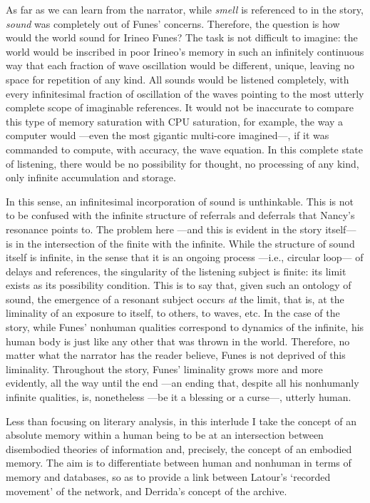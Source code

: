 As far as we can learn from the narrator, while \textit{smell} is referenced to in the story, \textit{sound} was completely out of Funes' concerns. Therefore, the question is how would the world sound for Irineo Funes? The task is not difficult to imagine: the world would be inscribed in poor Irineo's memory in such an infinitely continuous way that each fraction of wave oscillation would be different, unique, leaving no space for repetition of any kind. All sounds would be listened completely, with every infinitesimal fraction of oscillation of the waves pointing to the most utterly complete scope of imaginable references. It would not be inaccurate to compare this type of memory saturation with CPU saturation, for example, the way a computer would ---even the most gigantic multi-core imagined---, if it was commanded to compute, with accuracy, the wave equation. In this complete state of listening, there would be no possibility for thought, no processing of any kind, only infinite accumulation and storage.

In this sense, an infinitesimal incorporation of sound is unthinkable. This is not to be confused with the infinite structure of referrals and deferrals that Nancy's resonance points to. The problem here ---and this is evident in the story itself--- is in the intersection of the finite with the infinite. While the structure of sound itself is infinite, in the sense that it is an ongoing process ---i.e., circular loop--- of delays and references, the singularity of the listening subject is finite: its limit exists as its possibility condition. This is to say that, given such an ontology of sound, the emergence of a resonant subject occurs \textit{at} the limit, that is, at the liminality of an exposure to itself, to others, to waves, etc. In the case of the story, while Funes' nonhuman qualities correspond to dynamics of the infinite, his human body is just like any other that was thrown in the world. Therefore, no matter what the narrator has the reader believe, Funes is not deprived of this liminality. Throughout the story, Funes' liminality grows more and more evidently, all the way until the end ---an ending that, despite all his nonhumanly infinite qualities, is, nonetheless ---be it a blessing or a curse---, utterly human.

Less than focusing on literary analysis, in this interlude I take the concept of an absolute memory within a human being to be at an intersection between disembodied theories of information and, precisely, the concept of an embodied memory. The aim is to differentiate between human and nonhuman in terms of memory and databases, so as to provide a link between Latour's `recorded movement' of the network, and Derrida's concept of the archive. 

